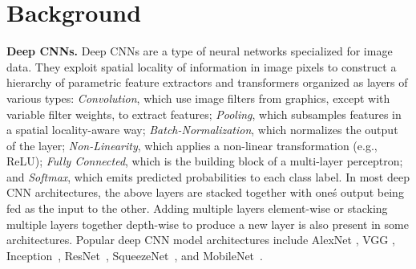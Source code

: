 \section{Background}

\vspace{2mm}
\noindent \textbf{Deep CNNs.} Deep CNNs are a type of neural networks specialized for image data.
They exploit spatial locality of information in image pixels to construct a hierarchy of parametric feature extractors and transformers organized as layers of various types: \textit{Convolution}, which use image
filters from graphics, except with variable filter weights, to extract features; \textit{Pooling}, which subsamples features in a spatial
locality-aware way; \textit{Batch-Normalization}, which normalizes the output of the layer; \textit{Non-Linearity}, which applies a non-linear transformation (e.g., ReLU); \textit{Fully Connected}, which is the building block of a multi-layer perceptron; and \textit{Softmax}, which emits predicted probabilities to each class label.
In most deep CNN architectures, the above layers are stacked together with one\'s output being fed as the input to the other.
Adding multiple layers element-wise or stacking multiple layers together depth-wise to produce a new layer is also present in some architectures.
Popular deep CNN model architectures include AlexNet \cite{alexnet}, VGG \cite{vggnet}, Inception~\cite{inception}, ResNet~\cite{resnet}, SqueezeNet~\cite{squeezenet}, and MobileNet~\cite{mobilenets}.


